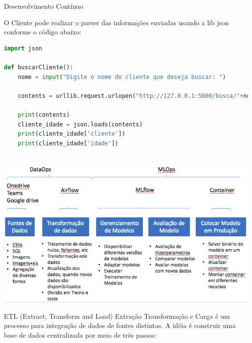\documentclass[aspectratio=169]{beamer} %
\begin{document}
\begin{SliTC}{Desenvolvimento Contínuo}

O Cliente pode realizar o parser das informações enviadas usando a lib json conforme o código abaixo:

\begin{lstlisting}[language=Python]
import json

def buscarCliente():
	nome = input("Digite o nome do cliente que deseja buscar: ")
	
	contents = urllib.request.urlopen("http://127.0.0.1:5000/busca/"+nome).read()

	print(contents)
	cliente_idade = json.loads(contents)
	print(cliente_idade['cliente'])
	print(cliente_idade['idade'])
	
\end{lstlisting}

\end{SliTC}

 {
\begin{center}
    \includegraphics[scale=0.45]{figs/3.png}
\end{center}
}
 {
ETL (Extract, Transform and Load) Extração Transformação e Carga é um processo para integração de dados de fontes distintas. A idéia é construir uma base de dados centralizada por meio de três passos:

\begin{itemize}

\end{itemize}

}
\end{document}
